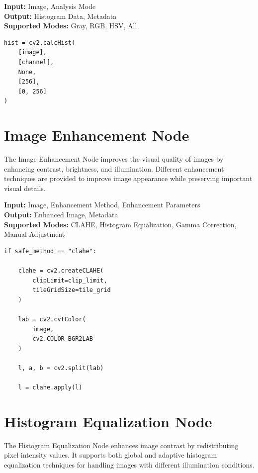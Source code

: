 \documentclass[a4paper,12pt]{report}
\begin{document}
\noindent \textbf{Input:} Image, Analysis Mode \\
\textbf{Output:} Histogram Data, Metadata \\
\textbf{Supported Modes:} Gray, RGB, HSV, All

\begin{lstlisting}[caption={Core Algorithm}, label={lst:histogram-analysis-node}]
hist = cv2.calcHist(
    [image],
    [channel],
    None,
    [256],
    [0, 256]
)
\end{lstlisting}

\section{Image Enhancement Node}
\label{sec:image-enhancement-node}

The Image Enhancement Node improves the visual quality of images by
enhancing contrast, brightness, and illumination. Different enhancement
techniques are provided to improve image appearance while preserving
important visual details.

\noindent \textbf{Input:} Image, Enhancement Method, Enhancement Parameters \\
\textbf{Output:} Enhanced Image, Metadata \\
\textbf{Supported Modes:} CLAHE, Histogram Equalization, Gamma Correction, Manual Adjustment

\begin{lstlisting}[caption={Core Algorithm}, label={lst:image-enhancement-node}]
if safe_method == "clahe":

    clahe = cv2.createCLAHE(
        clipLimit=clip_limit,
        tileGridSize=tile_grid
    )

    lab = cv2.cvtColor(
        image,
        cv2.COLOR_BGR2LAB
    )

    l, a, b = cv2.split(lab)

    l = clahe.apply(l)
\end{lstlisting}

\section{Histogram Equalization Node}
\label{sec:histogram-equalization-node}

The Histogram Equalization Node enhances image contrast by redistributing
pixel intensity values. It supports both global and adaptive histogram
equalization techniques for handling images with different illumination
conditions.
\end{document}
